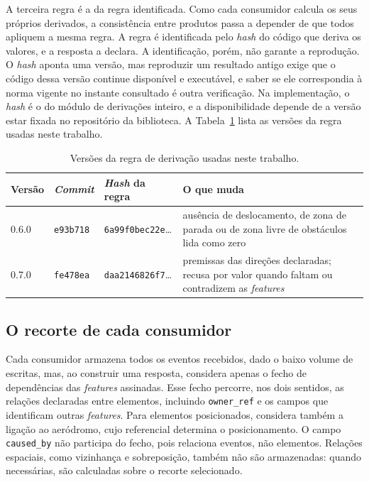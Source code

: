 A terceira regra é a da regra identificada. Como cada consumidor calcula os seus próprios derivados, a consistência entre produtos passa a depender de que todos apliquem a mesma regra. A regra é identificada pelo \textit{hash} do código que deriva os valores, e a resposta a declara. A identificação, porém, não garante a reprodução. O \textit{hash} aponta uma versão, mas reproduzir um resultado antigo exige que o código dessa versão continue disponível e executável, e saber se ele correspondia à norma vigente no instante consultado é outra verificação. Na implementação, o \textit{hash} é o do módulo de derivações inteiro, e a disponibilidade depende de a versão estar fixada no repositório da biblioteca. A Tabela~\ref{tab:versoes-regra} lista as versões da regra usadas neste trabalho.

\begin{table}[htbp]
    \centering
    \caption{Versões da regra de derivação usadas neste trabalho.}
    \label{tab:versoes-regra}
    \small
    \begin{tabularx}{\linewidth}{l l l X}
        \toprule
        Versão & \textit{Commit} & \textit{Hash} da regra & O que muda \\
        \midrule
        0.6.0 & \texttt{e93b718} & \texttt{6a99f0bec22e}\ldots & ausência de deslocamento, de zona de parada ou de zona livre de obstáculos lida como zero \\
        0.7.0 & \texttt{fe478ea} & \texttt{daa2146826f7}\ldots & premissas das direções declaradas; recusa por valor quando faltam ou contradizem as \textit{features} \\
        \bottomrule
    \end{tabularx}
    \par{}
\end{table}

\subsection{O recorte de cada consumidor}

Cada consumidor armazena todos os eventos recebidos, dado o baixo volume de
escritas, mas, ao construir uma resposta, considera apenas o fecho de
dependências das \textit{features} assinadas. Esse fecho percorre, nos dois
sentidos, as relações declaradas entre elementos, incluindo
\texttt{owner\_ref} e os campos que identificam outras \textit{features}.
Para elementos posicionados, considera também a ligação ao aeródromo, cujo
referencial determina o posicionamento. O campo \texttt{caused\_by} não
participa do fecho, pois relaciona eventos, não elementos. Relações
espaciais, como vizinhança e sobreposição, também não são armazenadas:
quando necessárias, são calculadas sobre o recorte selecionado.

